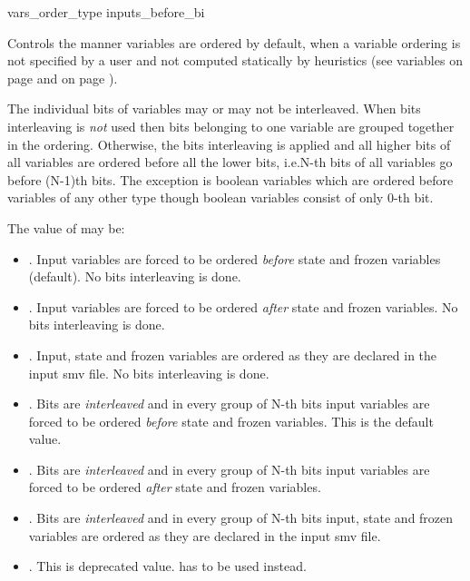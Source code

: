 \begin{nusmvVar} {vars\_order\_type}{}
    {inputs\_before\_bi}
\label{vars_order_type}

 Controls the manner variables are ordered by default, when a variable
 ordering is not specified by a user and not computed statically by
 heuristics (see variables  on page
 \pageref{input_order_file} and
  on page
 \pageref{bdd_static_order_heuristics}).

The individual bits of variables may or may not be interleaved. When
bits interleaving is \emph{not} used then bits belonging to one
variable are grouped together in the ordering.
%
Otherwise, the bits interleaving is applied and all higher bits of all
variables are ordered before all the lower bits, i.e.\@ N-th bits of
all variables go before (N-1)th bits.
%
The exception is boolean variables which are ordered before variables
of any other type though boolean variables consist of only 0-th bit.

The value of  may be:
\begin{itemize}
\item {}. Input variables are forced to be
  ordered \emph{before} state and frozen variables (default). No bits
  interleaving is done.

\item {}. Input variables are forced to be
  ordered \emph{after} state and frozen variables. No bits
  interleaving is done.

\item {}. Input, state and frozen variables
  are ordered as they are declared in the input smv file.
  No bits interleaving is done.

\item {}. Bits are \emph{interleaved} and
 in every group of N-th bits input variables are forced to be ordered
 \emph{before} state and frozen variables. This is the default value.

\item {}. Bits are \emph{interleaved} and
 in every group of N-th bits input variables are forced to be
  ordered \emph{after} state and frozen variables.

\item {}. Bits are \emph{interleaved} and
 in every group of N-th bits input, state and frozen variables
 are ordered as they are declared in the input smv file.

\item {}. This is deprecated value.  has to be used instead.

\end{itemize}
\end{nusmvVar}


